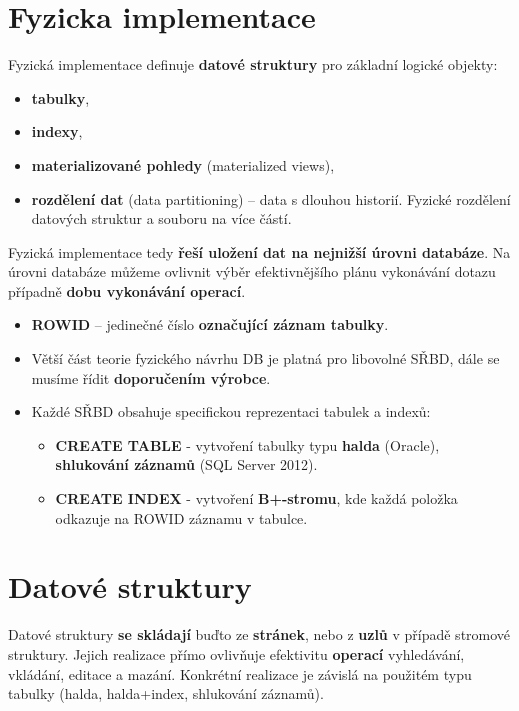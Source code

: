 \section{Fyzicka implementace}
Fyzická implementace definuje \textbf{datové struktury} pro základní logické objekty:

\begin{itemize}
  \item \textbf{tabulky},
  \item \textbf{indexy},
  \item \textbf{materializované pohledy} (materialized views),
  \item \textbf{rozdělení dat} (data partitioning) --  data s dlouhou historií. Fyzické rozdělení datových struktur a souboru na více částí.
\end{itemize}

Fyzická implementace tedy \textbf{řeší uložení dat na nejnižší úrovni databáze}.
Na úrovni databáze můžeme ovlivnit výběr efektivnějšího plánu vykonávání dotazu případně \textbf{dobu vykonávání operací}.

\begin{itemize}
  \item \textbf{ROWID} -- jedinečné číslo \textbf{označující záznam tabulky}.
  \item Větší část teorie fyzického návrhu DB je platná pro libovolné SŘBD, dále se musíme řídit \textbf{doporučením výrobce}.
  \item Každé SŘBD obsahuje specifickou reprezentaci tabulek a indexů:
        \begin{itemize}
          \item \textbf{CREATE TABLE} - vytvoření tabulky typu \textbf{halda} (Oracle), \textbf{shlukování záznamů} (SQL Server 2012).
          \item \textbf{CREATE INDEX} - vytvoření\textbf{ B+-stromu}, kde každá položka odkazuje na ROWID záznamu v tabulce.
        \end{itemize}
\end{itemize}

\section{Datové struktury}
Datové struktury \textbf{se skládají} buďto ze \textbf{stránek}, nebo z \textbf{uzlů} v případě stromové struktury. Jejich realizace přímo ovlivňuje efektivitu \textbf{operací} vyhledávání, vkládání, editace a mazání. Konkrétní realizace je závislá na použitém typu tabulky (halda, halda+index, shlukování záznamů).

